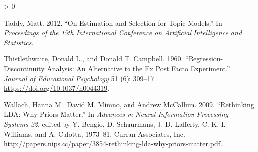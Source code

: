 \documentclass[
  12pt,
]{article}
\newlength{\cslhangindent}
\newenvironment{CSLReferences}[2] %
 {%
  \setlength{\parindent}{0pt}
  \ifodd #1 \everypar{\setlength{\hangindent}{\cslhangindent}}\ignorespaces\fi
  \ifnum #2 > 0
  \setlength{\parskip}{#2\baselineskip}
  \fi
 }%
 {}
\begin{document}
\begin{CSLReferences}{1}{0}
\leavevmode\hypertarget{ref-taddy_estimation_2012}{}%
Taddy, Matt. 2012. {``On Estimation and Selection for Topic Models.''}
In \emph{Proceedings of the 15th International Conference on Artificial
Intelligence and Statistics}.

\leavevmode\hypertarget{ref-thistlethwaite_regression-discontinuity_1960}{}%
Thistlethwaite, Donald L., and Donald T. Campbell. 1960.
{``Regression-Discontinuity Analysis: An Alternative to the Ex Post
Facto Experiment.''} \emph{Journal of Educational Psychology} 51 (6):
309--17. \url{https://doi.org/10.1037/h0044319}.

\leavevmode\hypertarget{ref-wallach_rethinking_2009}{}%
Wallach, Hanna M., David M. Mimno, and Andrew McCallum. 2009.
{``Rethinking {LDA}: Why Priors Matter.''} In \emph{Advances in Neural
Information Processing Systems 22}, edited by Y. Bengio, D. Schuurmans,
J. D. Lafferty, C. K. I. Williams, and A. Culotta, 1973--81. Curran
Associates, Inc.
\url{http://papers.nips.cc/paper/3854-rethinking-lda-why-priors-matter.pdf}.

\end{CSLReferences}
\end{document}
